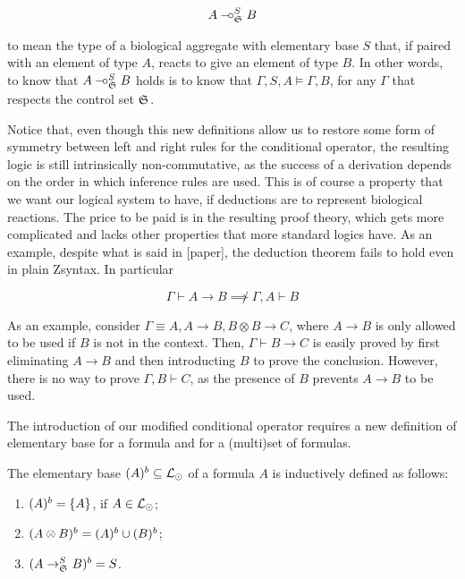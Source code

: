 \[
  A \mathbin{{-}\mkern-3.5mu{\circ}}_{\mathfrak{S}_{}}^{S} B
\]

to mean the type of a biological aggregate with elementary base $S$ that, if
paired with an element of type $A$, reacts to give an element of type $B$. In
other words, to know that $A \mathbin{{-}\mkern-3.5mu{\circ}}_{\mathfrak{S}_{}}^{S} B$ holds is to know that
$\Gamma, S, A \models \Gamma, B$, for any $\Gamma$ that respects the control set
$\mathfrak{S}_{}$.

Notice that, even though this new definitions allow us to restore some form of
symmetry between left and right rules for the conditional operator, the
resulting logic is still intrinsically non-commutative, as the success of a
derivation depends on the order in which inference rules are used. This is of
course a property that we want our logical system to have, if deductions are to
represent biological reactions. The price to be paid is in the resulting proof
theory, which gets more complicated and lacks other properties that more
standard logics have. As an example, despite what is said in [paper], the
deduction theorem fails to hold even in plain Zsyntax. In particular

\[
  \Gamma \vdash A \rightarrow B \not\implies \Gamma, A \vdash B
\]

As an example, consider $\Gamma \equiv A, A \rightarrow B, B \otimes B
\rightarrow C$, where $A \rightarrow B$ is only allowed to be used if $B$ is not
in the context. Then, $\Gamma \vdash B \rightarrow C$ is easily proved by first
eliminating $A \rightarrow B$ and then introducting $B$ to prove the conclusion.
However, there is no way to prove $\Gamma, B \vdash C$, as the presence of $B$
prevents $A \rightarrow B$ to be used.

The introduction of our modified conditional operator requires a new
definition of elementary base for a formula and for a (multi)set of formulas.

\begin{definition}
  The elementary base $(A)^{b} \subseteq \mathcal{L}_{\odot}$ of a formula $A$ is
  inductively defined as follows:

  \begin{enumerate}
  \item $(A)^{b} = \{ A \}$, if $A \in \mathcal{L}_{\odot}$;
  \item $(A \otimes B)^{b} = (A)^{b} \cup (B)^{b}$;
  \item $(A \rightarrow_{\mathfrak{S}_{}}^S B)^{b} = S$.
  \end{enumerate}
\end{definition}

